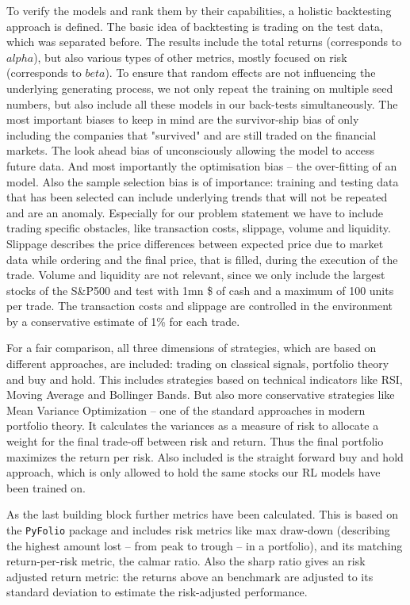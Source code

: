 \documentclass[12pt]{article}
\begin{document}
To verify the models and rank them by their capabilities, a holistic backtesting approach is defined. The basic idea of backtesting is trading on the test data, which was separated before. The results include the total returns (corresponds to $alpha$), but also various types of other metrics, mostly focused on risk (corresponds to $beta$). To ensure that random effects are not influencing the underlying generating process, we not only repeat the training on multiple seed numbers, but also include all these models in our back-tests simultaneously. 
The most important biases to keep in mind are the survivor-ship bias of only including the companies that "survived" and are still traded on the financial markets. The look ahead bias of unconsciously allowing the model to access future data. And most importantly the optimisation bias -- the over-fitting of an model.
Also the sample selection bias is of importance: training and testing data that has been selected can include underlying trends that will not be repeated and are an anomaly.
Especially for our problem statement we have to include trading specific obstacles, like transaction costs, slippage, volume and liquidity. Slippage describes the price differences between expected price due to market data while ordering  and the final price, that is filled, during the execution of the trade.  Volume and liquidity are not relevant, since we only include the largest stocks of the S\&P500 and test with 1mn \$ of cash and a maximum of 100 units per trade.  The transaction costs and slippage are controlled in the environment by a conservative estimate of 1\% for each trade.  \cite{liu2022finrlMeta, Hull2021, Prado2018, Garita2021} 

For a fair comparison, all three dimensions of strategies, which are based on different approaches, are included: trading on classical signals, portfolio theory and buy and hold. This includes strategies based on technical indicators like RSI, Moving Average and Bollinger Bands. But also more conservative strategies like Mean Variance Optimization -- one of the standard approaches in modern portfolio theory. It calculates the variances as a measure of risk to allocate a weight for the final trade-off between risk and return. Thus the final portfolio maximizes the return per risk. Also included is the straight forward buy and hold approach, which is only allowed to hold the same stocks our RL models have been trained on. 

As the last building block further metrics have been calculated. This is based on the \texttt{PyFolio} \cite{pyfolio} package and includes risk metrics like max draw-down (describing the highest amount lost -- from peak to trough -- in a portfolio), and its matching return-per-risk metric, the calmar ratio. Also the sharp ratio gives an risk adjusted return metric: the returns above an benchmark are adjusted to its standard deviation to estimate the risk-adjusted performance.
\end{document}
